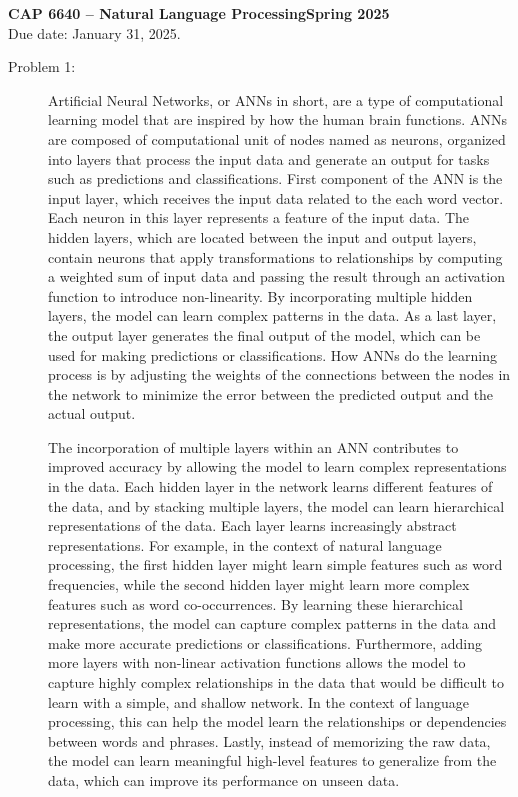 \documentclass[12pt]{article}
\begin{document}
\noindent \textbf{CAP 6640 -- Natural Language Processing\hspace*{\fill}Spring 2025}\\
 \hfill Due date: January 31, 2025.

\begin{description}
  \item[Problem 1: ] \hfill %
  
  Artificial Neural Networks, or ANNs in short, are a type of computational learning model that are inspired by how the human brain functions. 
  ANNs are composed of computational unit of nodes named as neurons, organized into layers that process the input data and generate an output for tasks such as predictions and classifications.
  First component of the ANN is the input layer, which receives the input data related to the each word vector. Each neuron in this layer represents a feature of the input data.
  The hidden layers, which are located between the input and output layers, contain neurons that apply transformations to relationships by computing a weighted sum of input data 
  and passing the result through an activation function to introduce non-linearity. By incorporating multiple hidden layers, the model can learn complex patterns in the data.
  As a last layer, the output layer generates the final output of the model, which can be used for making predictions or classifications.
  How ANNs do the learning process is by adjusting the weights of the connections between the nodes in the network to minimize the error between the predicted output and the actual output.

  The incorporation of multiple layers within an ANN contributes to improved accuracy by allowing the model to learn complex representations in the data.
  Each hidden layer in the network learns different features of the data, and by stacking multiple layers, the model can learn hierarchical representations of the data.
  Each layer learns increasingly abstract representations. For example, in the context of natural language processing, the first hidden layer might learn simple features such as
  word frequencies, while the second hidden layer might learn more complex features such as word co-occurrences. By learning these hierarchical representations, the model can capture
  complex patterns in the data and make more accurate predictions or classifications.
  Furthermore, adding more layers with non-linear activation functions allows the model to capture highly complex relationships in the data that would be difficult to learn 
  with a simple, and shallow network. In the context of language processing, this can help the model learn the relationships or dependencies between words and phrases.
  Lastly, instead of memorizing the raw data, the model can learn meaningful high-level features to generalize from the data, which can improve its performance on unseen data.
  

\end{description}
\end{document}
